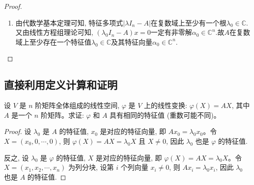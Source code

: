 \documentclass[../../main.tex]{subfiles}%
\begin{document}
\begin{proof}
\begin{enumerate}
\begin{align*}
\begin{pmatrix}
    x_1\\
    x_2\\
    \vdots\\
    x_n\\
    \end{pmatrix}\\
    &=(e_1,e_2,\cdots ,e_n)\cdot\lambda_0I_n\begin{pmatrix}
    x_1\\
    x_2\\
    \vdots\\
    x_n\\
    \end{pmatrix}=\lambda_0(e_1,e_2,\cdots ,e_n)\begin{pmatrix}
    x_1\\
    x_2\\
    \vdots\\
    x_n\\
    \end{pmatrix}=\lambda_0\alpha_0.
    \end{align*}
故$\varphi$在$V$上至少存在一个特征值$\lambda_0\in\mathbb{C}$及其特征向量$\alpha_0\in V$.

\item 由代数学基本定理可知, 特征多项式\(|\lambda I_n - A|\)在复数域上至少有一个根\(\lambda_0\in \mathbb{C}\).
又由线性方程组理论可知, \((\lambda_0I_n - A)x = 0\)一定有非零解\(\alpha_0\in \mathbb{C}^n\).故$A$在复数域上至少存在一个特征值$\lambda_0\in\mathbb{C}$及其特征向量$\alpha_0\in\mathbb{C}^n$.
\end{enumerate}
\end{proof}

\subsection{直接利用定义计算和证明}

\begin{example}\label{example:由矩阵诱导的线性变换的特征值与其诱导矩阵相同}
设 $V$ 是 $n$ 阶矩阵全体组成的线性空间, $\varphi$ 是 $V$ 上的线性变换: $\varphi(X) = AX$, 其中 $A$ 是一个 $n$ 阶矩阵。求证: $\varphi$ 和 $A$ 具有相同的特征值 (重数可能不同)。
\end{example}
\begin{proof}
设 $\lambda_0$ 是 $A$ 的特征值, $x_0$ 是对应的特征向量, 即 $Ax_0 = \lambda_0 x_0$。令 $X = (x_0, 0, \cdots, 0)$, 则 $\varphi(X) = AX = \lambda_0 X$ 且 $X \neq 0$, 因此 $\lambda_0$ 也是 $\varphi$ 的特征值.

反之, 设 $\lambda_0$ 是 $\varphi$ 的特征值, $X$ 是对应的特征向量, 即 $\varphi(X) = AX = \lambda_0 X$。令 $X = (x_1, x_2, \cdots, x_n)$ 为列分块, 设第 $i$ 个列向量 $x_i \neq 0$, 则 $Ax_i = \lambda_0 x_i$, 因此 $\lambda_0$ 也是 $A$ 的特征值.
\end{proof}
\end{document}
